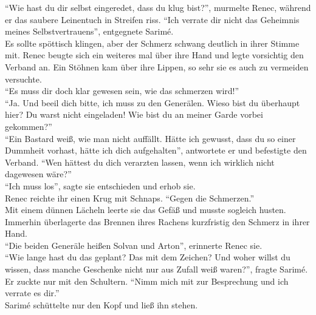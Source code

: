 ``Wie hast du dir selbst eingeredet, dass du klug bist?'', murmelte Renec, während er das saubere 
Leinentuch in Streifen riss.
``Ich verrate dir nicht das Geheimnis meines Selbstvertrauens'', entgegnete Sarimé.\\
Es sollte spöttisch klingen, aber der Schmerz schwang deutlich in ihrer Stimme mit. Renec beugte 
sich ein weiteres mal über ihre Hand und legte vorsichtig den Verband an. Ein Stöhnen kam über ihre 
Lippen, so sehr sie es auch zu vermeiden versuchte.\\
``Es muss dir doch klar gewesen sein, wie das schmerzen wird!''\\
``Ja. Und beeil dich bitte, ich muss zu den Generälen. Wieso bist du überhaupt hier? Du warst nicht 
eingeladen! Wie bist du an meiner Garde vorbei gekommen?''\\
``Ein Bastard weiß, wie man nicht auffällt. Hätte ich gewusst, dass du so einer Dummheit vorhast, 
hätte ich dich aufgehalten'', antwortete er und befestigte den Verband. ``Wen hättest du dich 
verarzten lassen, wenn ich wirklich nicht dagewesen wäre?''\\
``Ich muss los'', sagte sie entschieden und erhob sie.\\
Renec reichte ihr einen Krug mit Schnaps. ``Gegen die Schmerzen.''\\
Mit einem dünnen Lächeln leerte sie das Gefäß und musste sogleich husten. Immerhin überlagerte das 
Brennen ihres Rachens kurzfristig den Schmerz in ihrer Hand.\\
``Die beiden Generäle heißen Solvan und Arton'', erinnerte Renec sie.\\
``Wie lange hast du das geplant? Das mit dem Zeichen? Und woher willst du wissen, dass manche 
Geschenke nicht nur aus Zufall weiß waren?'', fragte Sarimé.\\
Er zuckte nur mit den Schultern. ``Nimm mich mit zur Besprechung und ich verrate es dir.''\\
Sarimé schüttelte nur den Kopf und ließ ihn stehen.\\

